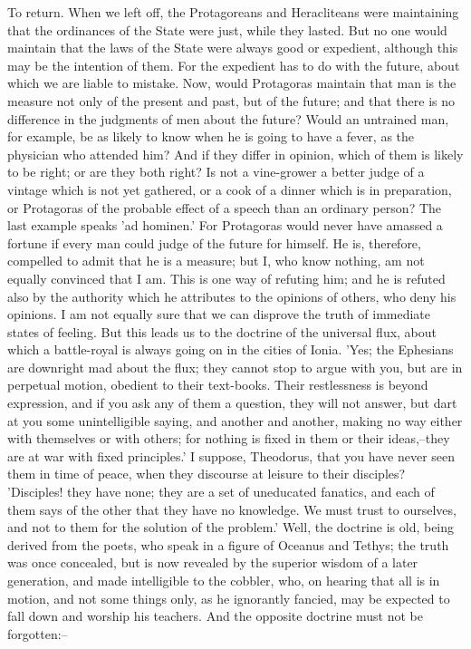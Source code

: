 To return. When we left off, the Protagoreans and Heracliteans were
maintaining that the ordinances of the State were just, while they
lasted. But no one would maintain that the laws of the State were always
good or expedient, although this may be the intention of them. For
the expedient has to do with the future, about which we are liable to
mistake. Now, would Protagoras maintain that man is the measure not
only of the present and past, but of the future; and that there is no
difference in the judgments of men about the future? Would an untrained
man, for example, be as likely to know when he is going to have a fever,
as the physician who attended him? And if they differ in opinion,
which of them is likely to be right; or are they both right? Is not a
vine-grower a better judge of a vintage which is not yet gathered, or a
cook of a dinner which is in preparation, or Protagoras of the probable
effect of a speech than an ordinary person? The last example speaks 'ad
hominen.' For Protagoras would never have amassed a fortune if every man
could judge of the future for himself. He is, therefore, compelled to
admit that he is a measure; but I, who know nothing, am not equally
convinced that I am. This is one way of refuting him; and he is refuted
also by the authority which he attributes to the opinions of others, who
deny his opinions. I am not equally sure that we can disprove the truth
of immediate states of feeling. But this leads us to the doctrine of
the universal flux, about which a battle-royal is always going on in the
cities of Ionia. 'Yes; the Ephesians are downright mad about the
flux; they cannot stop to argue with you, but are in perpetual motion,
obedient to their text-books. Their restlessness is beyond expression,
and if you ask any of them a question, they will not answer, but dart at
you some unintelligible saying, and another and another, making no way
either with themselves or with others; for nothing is fixed in them
or their ideas,--they are at war with fixed principles.' I suppose,
Theodorus, that you have never seen them in time of peace, when they
discourse at leisure to their disciples? 'Disciples! they have none;
they are a set of uneducated fanatics, and each of them says of the
other that they have no knowledge. We must trust to ourselves, and not
to them for the solution of the problem.' Well, the doctrine is old,
being derived from the poets, who speak in a figure of Oceanus and
Tethys; the truth was once concealed, but is now revealed by the
superior wisdom of a later generation, and made intelligible to the
cobbler, who, on hearing that all is in motion, and not some things
only, as he ignorantly fancied, may be expected to fall down and worship
his teachers. And the opposite doctrine must not be forgotten:--


